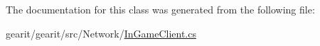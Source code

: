 The documentation for this class was generated from the following file\+:\begin{DoxyCompactItemize}
\item 
gearit/gearit/src/\+Network/\hyperlink{_in_game_client_8cs}{In\+Game\+Client.\+cs}\end{DoxyCompactItemize}
